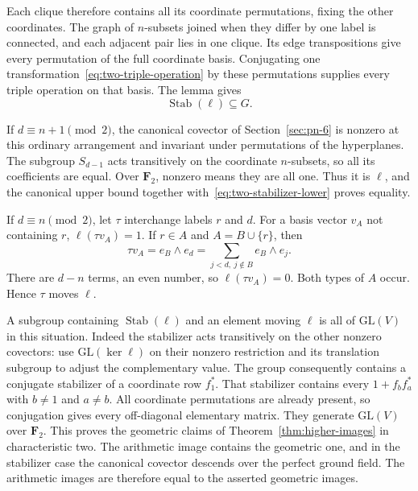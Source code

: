 Each clique therefore contains all its coordinate permutations, fixing the other coordinates. The graph of $n$-subsets joined when they differ by one label is connected, and each adjacent pair lies in one clique. Its edge transpositions give every permutation of the full coordinate basis. Conjugating one transformation~\eqref{eq:two-triple-operation} by these permutations supplies every triple operation on that basis. The lemma gives
\begin{equation}\label{eq:two-stabilizer-lower}
\operatorname{Stab}(\ell)\subseteq G.
\end{equation}

If $d\equiv n+1\pmod2$, the canonical covector of Section~\ref{sec:pn-6} is nonzero at this ordinary arrangement and invariant under permutations of the hyperplanes. The subgroup $S_{d-1}$ acts transitively on the coordinate $n$-subsets, so all its coefficients are equal. Over $\mathbf F_2$, nonzero means they are all one. Thus it is $\ell$, and the canonical upper bound together with~\eqref{eq:two-stabilizer-lower} proves equality.

If $d\equiv n\pmod2$, let $\tau$ interchange labels $r$ and $d$. For a basis vector $v_A$ not containing $r$, $\ell(\tau v_A)=1$. If $r\in A$ and $A=B\cup\{r\}$, then
\[
\tau v_A=e_B\wedge e_d=
\sum_{j<d,\ j\notin B}e_B\wedge e_j.
\]
There are $d-n$ terms, an even number, so $\ell(\tau v_A)=0$. Both types of $A$ occur. Hence $\tau$ moves $\ell$.

A subgroup containing $\operatorname{Stab}(\ell)$ and an element moving $\ell$ is all of $\mathrm{GL}(V)$ in this situation. Indeed the stabilizer acts transitively on the other nonzero covectors: use $\mathrm{GL}(\ker\ell)$ on their nonzero restriction and its translation subgroup to adjust the complementary value. The group consequently contains a conjugate stabilizer of a coordinate row $f_1^*$. That stabilizer contains every $1+f_bf_a^*$ with $b\ne1$ and $a\ne b$. All coordinate permutations are already present, so conjugation gives every off-diagonal elementary matrix. They generate $\mathrm{GL}(V)$ over $\mathbf F_2$. This proves the geometric claims of Theorem~\ref{thm:higher-images} in characteristic two. The arithmetic image contains the geometric one, and in the stabilizer case the canonical covector descends over the perfect ground field. The arithmetic images are therefore equal to the asserted geometric images.

